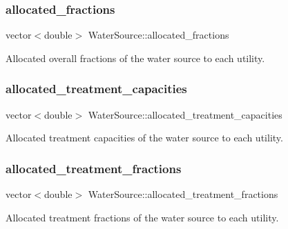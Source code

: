 \subsubsection{\texorpdfstring{allocated\+\_\+fractions}{allocated\_fractions}}
{\footnotesize\ttfamily vector$<$double$>$ Water\+Source\+::allocated\+\_\+fractions\hspace{0.3cm}{\ttfamily [protected]}}



Allocated overall fractions of the water source to each utility. 

\mbox{\label{classWaterSource_a87dc0bfb5cf4e2b9a953c7a80058c923}} 
\subsubsection{\texorpdfstring{allocated\+\_\+treatment\+\_\+capacities}{allocated\_treatment\_capacities}}
{\footnotesize\ttfamily vector$<$double$>$ Water\+Source\+::allocated\+\_\+treatment\+\_\+capacities\hspace{0.3cm}{\ttfamily [protected]}}



Allocated treatment capacities of the water source to each utility. 

\mbox{\label{classWaterSource_aa73fe10cfc6579b2fb79529e1dde5140}} 
\subsubsection{\texorpdfstring{allocated\+\_\+treatment\+\_\+fractions}{allocated\_treatment\_fractions}}
{\footnotesize\ttfamily vector$<$double$>$ Water\+Source\+::allocated\+\_\+treatment\+\_\+fractions\hspace{0.3cm}{\ttfamily [protected]}}



Allocated treatment fractions of the water source to each utility. 

